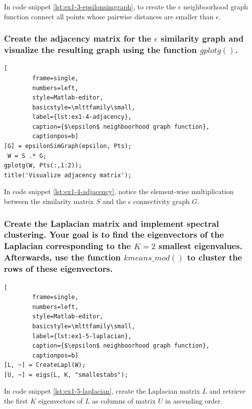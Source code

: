 \documentclass[unicode,11pt,a4paper,oneside,numbers=endperiod,openany]{scrartcl}
\begin{document}
In code snippet \ref{lst:ex1-3-epsilonsimgraph}, to create the $\epsilon$ neighboorhood graph function
connect all points whose pairwise distances are smaller than $\epsilon$.


\subsubsection{
    Create the adjacency matrix for the $\epsilon$ similarity graph and
    visualize the resulting graph using the function $gplotg()$.}

\begin{lstlisting}[
        frame=single,
        numbers=left,
        style=Matlab-editor,
        basicstyle=\mlttfamily\small,
        label={lst:ex1-4-adjacency},
        caption={$\epsilon$ neighboorhood graph function},
        captionpos=b]
[G] = epsilonSimGraph(epsilon, Pts);
 W = S .* G;
gplotg(W, Pts(:,1:2));
title('Visualize adjacency matrix');
\end{lstlisting}

In code snippet \ref{lst:ex1-4-adjacency}, notice the element-wise multiplication
between the similarity matrix $S$ and the $\epsilon$ connectivity graph $G$.

\subsubsection{
    Create the Laplacian matrix and implement spectral clustering.
    Your goal is to find the eigenvectors of the Laplacian corresponding to the $K = 2$ smallest eigenvalues.
    Afterwards, use the function $kmeans\_mod()$ to cluster the rows of these eigenvectors.}

\begin{lstlisting}[
        frame=single,
        numbers=left,
        style=Matlab-editor,
        basicstyle=\mlttfamily\small,
        label={lst:ex1-5-laplacian},
        caption={$\epsilon$ neighboorhood graph function},
        captionpos=b]
[L, ~] = CreateLapl(W);
[U, ~] = eigs(L, K, "smallestabs");
\end{lstlisting}

In code snippet \ref{lst:ex1-5-laplacian}, create the Laplacian matrix $L$ and
retrieve the first $K$ eigenvectors of $L$ as columns of matrix $U$ in ascending order.

\end{document}
